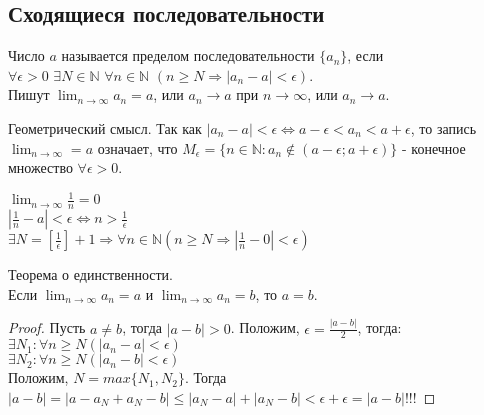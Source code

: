 \subsection{Сходящиеся последовательности}

    \begin{definition}
        Число $a$ называется пределом последовательности $\{a_{n}\}$, если\\ $\forall \epsilon > 0$ $ \exists N \in \mathds{N}$ $\forall n \in \mathds{N}$ $(n \geq N \Rightarrow |a_{n}-a| < \epsilon)$.
        \\
        Пишут $\lim_{n \to \infty} a_{n} = a$, или $a_{n} \to a$ при $n \to \infty$, или $a_{n} \to a$.
    \end{definition}
    
    \begin{note}
    Геометрический смысл. Так как $|a_{n}-a| < \epsilon \iff a-\epsilon < a_{n} < a + \epsilon$, 
    то запись $\lim_{n \to \infty} = a$ означает, что
    $M_{\epsilon} = \{n \in \mathds{N} : a_{n} \notin (a-\epsilon; a+\epsilon)\}$
    - конечное множество $\forall \epsilon > 0$.
    \end{note}

    \begin{example}
        $\lim_{n \to \infty} \frac{1}{n} = 0$\\
        $|\frac{1}{n} - a| < \epsilon \iff n > \frac{1}{\epsilon}$\\
        $\exists N = [\frac{1}{\epsilon}] + 1 \Rightarrow \forall n \in \mathds{N} (n \geq N \Rightarrow |\frac{1}{n}-0| < \epsilon)$
    \end{example}

    \begin{theorem}{Теорема о единственности.}
        \\
        Если $\lim_{n \to \infty} a_{n} = a$ и $\lim_{n \to \infty} a_{n} = b$, то $a = b$.\\
    \end{theorem}

    \begin{proof}
        Пусть $a \neq b$, тогда $|a-b| > 0$. Положим, $\epsilon = \frac{|a-b|}{2}$, тогда:\\
        $\exists N_1 : \forall n \geq N (|a_{n} - a| < \epsilon)$\\
        $\exists N_2 : \forall n \geq N (|a_{n} - b| < \epsilon)$\\
        Положим, $N = max\{N_1, N_2\}$. Тогда $|a-b| = |a-a_{N}+a_{N}-b| \leq |a_{N}-a| + |a_{N}-b| < \epsilon + \epsilon = |a-b|$!!!
    \end{proof}


